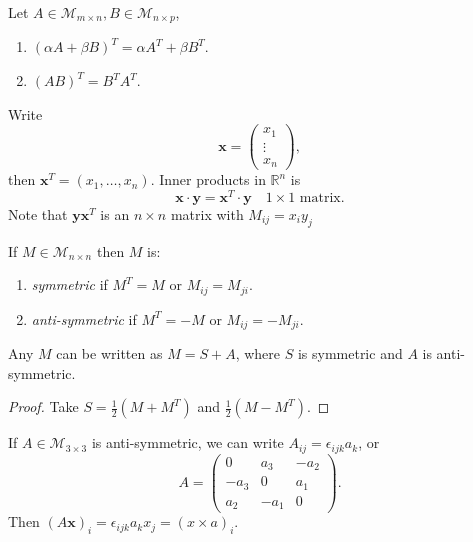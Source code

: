 \documentclass[10pt]{article}
\begin{document}
    \begin{proposition}[Properties]
        Let $ A\in \mathcal{M}_{m\times n}, B\in \mathcal{M}_{n\times p} $,
        \begin{enumerate}
            \item $ (\alpha A+\beta B)^T=\alpha A^T+\beta B^T $.
            \item $ (AB)^T=B^TA^T $.
        \end{enumerate}
    \end{proposition}
    \begin{remark}
        Write 
        \[
            \mathbf{x}=\begin{pmatrix}
                x_1\\\vdots\\x_n
            \end{pmatrix}
        ,\]
        then $ \mathbf{x}^T=(x_1,\dots,x_n) $. Inner products in $ \mathbb{R}^{n} $ is 
        \[
            \mathbf{x}\cdot \mathbf{y}=\mathbf{x}^T \cdot \mathbf{y}\quad 1 \times 1 \text{ matrix}
        .\]
        Note that $ \mathbf{y}\mathbf{x}^T $ is an $ n \times n $ matrix with $ M_{ij}=x_iy_j $
    \end{remark}
    \begin{definition}
        If $ M\in \mathcal{M}_{n\times n} $ then $M$ is:
        \begin{enumerate}
            \item \textit{symmetric} if $ M^T=M $ or $ M_{ij}=M_{ji} $.
            \item \textit{anti-symmetric} if $ M^T=-M $ or $ M_{ij}=-M_{ji} $.
        \end{enumerate}
    \end{definition}
    \begin{proposition}
        Any $ M $ can be written as $ M=S+A $, where $S$ is symmetric and $A$ is anti-symmetric.
    \end{proposition}
    \begin{proof}
        Take $ S=\frac{1}{2}(M+M^T) $ and $ \frac{1}{2}(M-M^T) $.
    \end{proof}
    \begin{remark}
        If $ A\in \mathcal{M}_{3\times 3} $ is anti-symmetric, we can write $ A_{ij}=\epsilon_{ijk}a_k $, or 
        \[
            A=\begin{pmatrix}
                0&a_3&-a_2\\
                -a_3&0&a_1\\
                a_2&-a_1&0
            \end{pmatrix}
        .\]
        Then $ (A \mathbf{x})_{i}=\epsilon_{ijk}a_kx_j=(x \times a)_{i} $.
    \end{remark}
\end{document}
